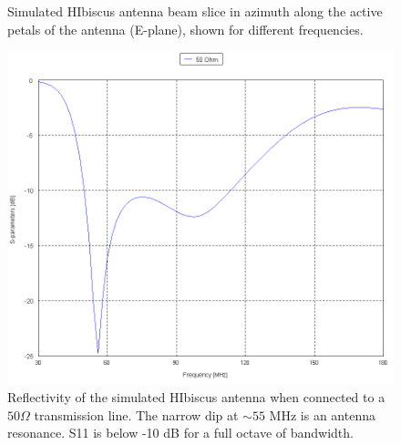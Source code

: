 \begin{figure}[htb]
\begin{minipage}[b]{0.47\textwidth}
\caption{Simulated HIbiscus antenna beam slice in azimuth along the active petals of the antenna (E-plane), shown for different frequencies.}
\label{Fig:HIsym_beam_2}
\end{minipage}
\end{figure}
 
\begin{figure}[htb]
\centering
\begin{minipage}[b]{0.49\textwidth}
\centering
\includegraphics[width=0.95\linewidth]{SCIHI_system/figures/HIbiscus_S11_50_Cart.png}
\caption{Reflectivity of the simulated HIbiscus antenna when connected to a $50 \Omega$ transmission line. The narrow dip at $\sim 55$ MHz is an antenna resonance. S11 is below -10 dB for a full octave of bandwidth.}
\label{Fig:HIsim_S11_dB}
\end{minipage}%
\begin{minipage}[b]{0.02\textwidth}
\hspace{1cm}
\end{minipage}%
\begin{minipage}[b]{0.46\textwidth}
\centering

\end{minipage}
\end{figure}
